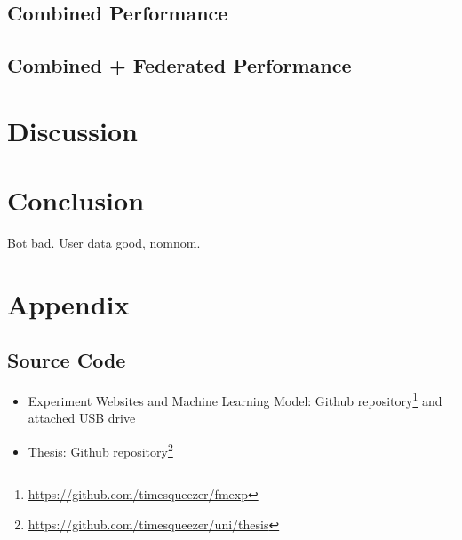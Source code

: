 \documentclass[
    fontsize=12pt,
    headings=small,
    parskip=half,           %
    bibliography=totoc,
    numbers=noenddot,       %
    open=any,               %
    final                   %
]{scrreprt}
\begin{document}
\section{Combined Performance}

\section{Combined + Federated Performance}


\chapter{Discussion}


\chapter{Conclusion}
Bot bad. User data good, nomnom.


\begin{raggedright}
  \printbibliography
\end{raggedright}

\chapter*{Appendix}

\section{Source Code}

\begin{itemize}
	\item Experiment Websites and Machine Learning Model: Github repository\footnote{\url{https://github.com/timesqueezer/fmexp}} and attached USB drive
	\item Thesis: Github repository\footnote{\url{https://github.com/timesqueezer/uni/thesis}}
\end{itemize}
\end{document}
